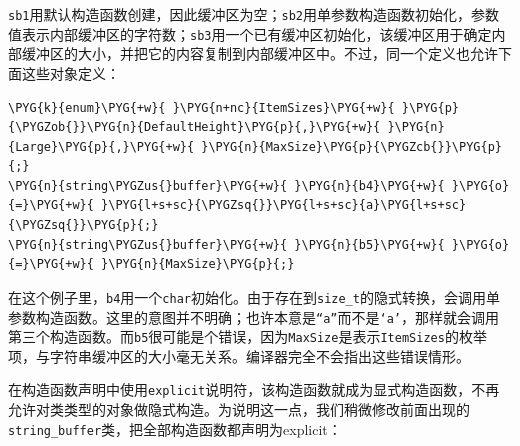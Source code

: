
\texttt{sb1}用默认构造函数创建，因此缓冲区为空；\texttt{sb2}用单参数构造函数初始化，参数值表示内部缓冲区的字符数；\texttt{sb3}用一个已有缓冲区初始化，该缓冲区用于确定内部缓冲区的大小，并把它的内容复制到内部缓冲区中。不过，同一个定义也允许下面这些对象定义：



\begin{codeblockbg}
\begin{Verbatim}[commandchars=\\\{\},breaklines=true,breakanywhere=true,fontsize=\codefont,xleftmargin=17bp]
\PYG{k}{enum}\PYG{+w}{ }\PYG{n+nc}{ItemSizes}\PYG{+w}{ }\PYG{p}{\PYGZob{}}\PYG{n}{DefaultHeight}\PYG{p}{,}\PYG{+w}{ }\PYG{n}{Large}\PYG{p}{,}\PYG{+w}{ }\PYG{n}{MaxSize}\PYG{p}{\PYGZcb{}}\PYG{p}{;}
\PYG{n}{string\PYGZus{}buffer}\PYG{+w}{ }\PYG{n}{b4}\PYG{+w}{ }\PYG{o}{=}\PYG{+w}{ }\PYG{l+s+sc}{\PYGZsq{}}\PYG{l+s+sc}{a}\PYG{l+s+sc}{\PYGZsq{}}\PYG{p}{;}
\PYG{n}{string\PYGZus{}buffer}\PYG{+w}{ }\PYG{n}{b5}\PYG{+w}{ }\PYG{o}{=}\PYG{+w}{ }\PYG{n}{MaxSize}\PYG{p}{;}
\end{Verbatim}
\end{codeblockbg}



在这个例子里，\texttt{b4}用一个\texttt{char}初始化。由于存在到\texttt{size\_\allowbreak{}t}的隐式转换，会调用单参数构造函数。这里的意图并不明确；也许本意是\texttt{“a”}而不是\texttt{‘a’}，那样就会调用第三个构造函数。而\texttt{b5}很可能是个错误，因为\texttt{MaxSize}是表示\texttt{ItemSizes}的枚举项，与字符串缓冲区的大小毫无关系。编译器完全不会指出这些错误情形。


在构造函数声明中使用\texttt{explicit}说明符，该构造函数就成为显式构造函数，不再允许对类类型的对象做隐式构造。为说明这一点，我们稍微修改前面出现的\texttt{string\_\allowbreak{}buffer}类，把全部构造函数都声明为explicit：



